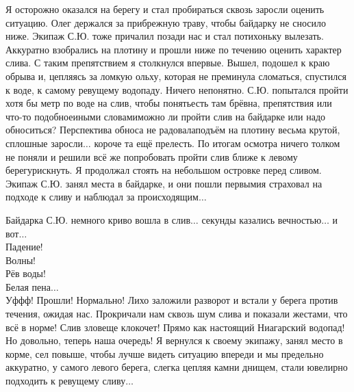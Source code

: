 Я осторожно оказался на берегу и стал пробираться сквозь заросли оценить ситуацию. Олег держался за прибрежную траву, чтобы байдарку не сносило ниже. Экипаж С.Ю. тоже причалил позади нас и стал потихоньку вылезать. Аккуратно взобрались на плотину и прошли ниже по течению оценить характер слива. С таким препятствием я столкнулся впервые. Вышел, подошел к краю обрыва и, цепляясь за ломкую ольху, которая не преминула сломаться, спустился к воде, к самому ревущему водопаду. Ничего непонятно. С.Ю. попытался пройти хотя бы метр по воде на слив, чтобы понять\mdash есть там брёвна, препятствия или что-то подобное\mdash иными словами\mdash можно ли пройти слив на байдарке или надо обноситься? Перспектива обноса не радовала\mdash подъём на плотину весьма крутой, сплошные заросли$\ldots$ короче та ещё прелесть. По итогам осмотра ничего толком не поняли и решили всё же попробовать пройти слив ближе к левому берегу\mdash рискнуть. Я продолжал стоять на небольшом островке перед сливом. Экипаж С.Ю. занял места в байдарке, и они пошли первыми\mdash я страховал на подходе к сливу и наблюдал за происходящим$\ldots$

Байдарка С.Ю. немного криво вошла в слив$\ldots$ секунды казались вечностью$\ldots$ и вот$\ldots$\\
Падение!\\
\hspace*{15mm} Волны!\\
\hspace*{29mm} Рёв воды!\\
\hspace*{47mm} Белая пена$\ldots$\\
\noindent Уф\sdash ф\sdash ф! Прошли! Нормально! Лихо заложили разворот и встали у берега против течения, ожидая нас. Прокричали нам сквозь шум слива и показали жестами, что всё в норме! Слив зловеще клокочет! Прямо как настоящий Ниагарский водопад! Но довольно, теперь наша очередь! Я вернулся к своему экипажу, занял место в корме, сел повыше, чтобы лучше видеть ситуацию впереди и мы предельно аккуратно, у самого левого берега, слегка цепляя камни днищем, стали ювелирно подходить к ревущему сливу$\ldots$
 
